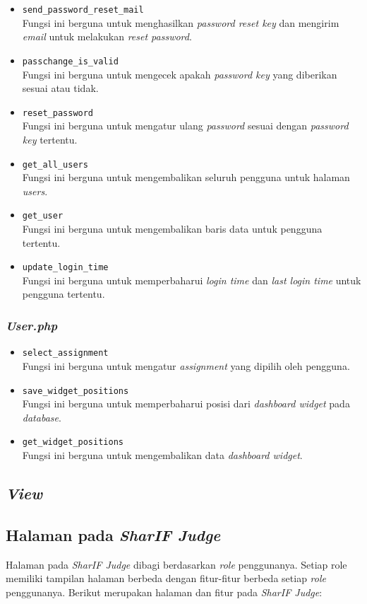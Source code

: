 \begin{itemize}
	\item \texttt{send\_password\_reset\_mail}\\
	Fungsi ini berguna untuk menghasilkan \textit{password reset key} dan mengirim \textit{email} untuk melakukan \textit{reset password}.
	\item \texttt{passchange\_is\_valid}\\
	Fungsi ini berguna untuk mengecek apakah \textit{password key} yang diberikan sesuai atau tidak.
	\item \texttt{reset\_password}\\
	Fungsi ini berguna untuk mengatur ulang \textit{password} sesuai dengan \textit{password key} tertentu.
	\item \texttt{get\_all\_users}\\
	Fungsi ini berguna untuk mengembalikan seluruh pengguna untuk halaman \textit{users}.
	\item \texttt{get\_user}\\
	Fungsi ini berguna untuk mengembalikan baris data untuk pengguna tertentu.
	\item \texttt{update\_login\_time}\\
	Fungsi ini berguna untuk memperbaharui \textit{login time} dan \textit{last login time} untuk pengguna tertentu.
\end{itemize}
\subsubsection{\textit{User.php}}
\begin{itemize}
	\item \texttt{select\_assignment}\\
	Fungsi ini berguna untuk mengatur \textit{assignment} yang dipilih oleh pengguna.
	\item \texttt{save\_widget\_positions}\\
	Fungsi ini berguna untuk memperbaharui posisi dari \textit{dashboard widget} pada \textit{database}.
	\item \texttt{get\_widget\_positions}\\
	Fungsi ini berguna untuk mengembalikan data \textit{dashboard widget}.
\end{itemize}

\subsection{\textit{View}}
\subsection{Halaman pada \textit{SharIF Judge}}
Halaman pada \textit{SharIF Judge} dibagi berdasarkan \textit{role} penggunanya. Setiap role memiliki tampilan halaman berbeda dengan fitur-fitur berbeda setiap \textit{role} penggunanya. Berikut merupakan halaman dan fitur pada \textit{SharIF Judge}:

